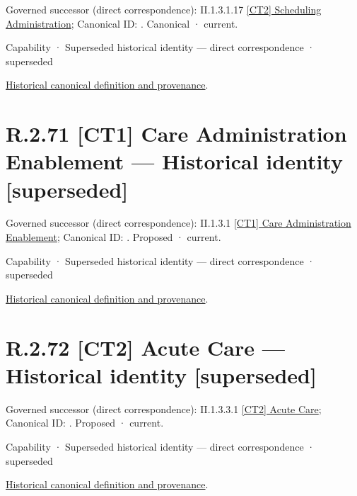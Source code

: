 {\small Governed successor (direct correspondence): II.1.3.1.17 \hyperref[element:35fb3744c900470f9895056246a13fb1]{[CT2] Scheduling Administration}; Canonical ID: \texttt{}. Canonical · current.}\par
\label{element:1a6630940ffb44fcad4543b93a367b67}
{\small Capability · Superseded historical identity — direct correspondence · superseded}\par
\href{../../../../continuum/strategy/capability/1a6630940ffb44fcad4543b93a367b67.md}{Historical canonical definition and provenance}.\par
\section*{R.2.71 [CT1] Care Administration Enablement — Historical identity [superseded]}
\label{navigation:R.2.71}

{\small Governed successor (direct correspondence): II.1.3.1 \hyperref[element:28df27d55c514a37995145ab46945f78]{[CT1] Care Administration Enablement}; Canonical ID: \texttt{}. Proposed · current.}\par
\label{element:b611a1fcfadb4b30af9ba74a4c993d8a}
{\small Capability · Superseded historical identity — direct correspondence · superseded}\par
\href{../../../../continuum/strategy/capability/b611a1fcfadb4b30af9ba74a4c993d8a.md}{Historical canonical definition and provenance}.\par
\section*{R.2.72 [CT2] Acute Care — Historical identity [superseded]}
\label{navigation:R.2.72}

{\small Governed successor (direct correspondence): II.1.3.3.1 \hyperref[element:9bb988c526404522b83aeed5069e0eb5]{[CT2] Acute Care}; Canonical ID: \texttt{}. Proposed · current.}\par
\label{element:7b591957f7424424abc80f699e9f1960}
{\small Capability · Superseded historical identity — direct correspondence · superseded}\par
\href{../../../../continuum/strategy/capability/7b591957f7424424abc80f699e9f1960.md}{Historical canonical definition and provenance}.\par
